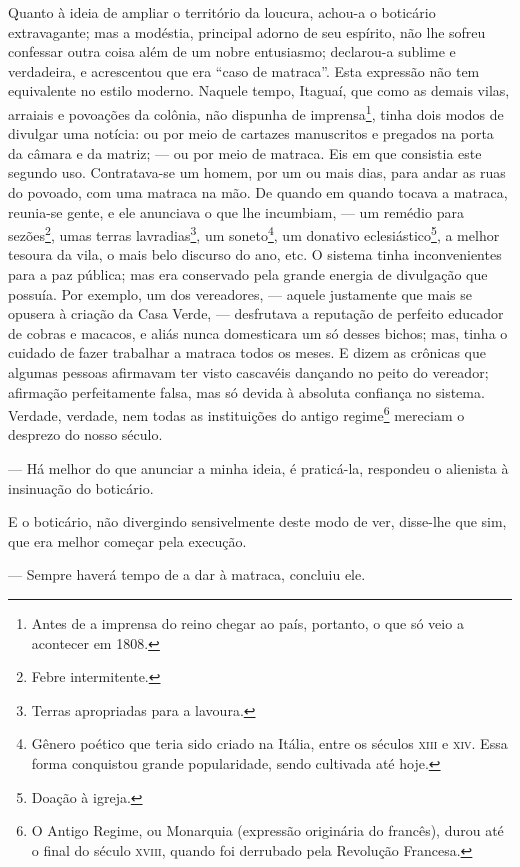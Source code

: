 Quanto à ideia de ampliar o território da loucura, achou-a o boticário
extravagante; mas a modéstia, principal adorno de seu espírito, não lhe
sofreu confessar outra coisa além de um nobre entusiasmo; declarou-a
sublime e verdadeira, e acrescentou que era ``caso de matraca''. Esta
expressão não tem equivalente no estilo moderno. Naquele tempo, Itaguaí,
que como as demais vilas, arraiais e povoações da colônia, não dispunha
de imprensa\footnote{Antes de a imprensa do reino chegar ao país,
  portanto, o que só veio a acontecer em 1808.}, tinha dois modos de
divulgar uma notícia: ou por meio de cartazes manuscritos e pregados na
porta da câmara e da matriz; --- ou por meio de matraca. Eis em que
consistia este segundo uso. Contratava-se um homem, por um ou mais dias,
para andar as ruas do povoado, com uma matraca na mão. De quando em
quando tocava a matraca, reunia-se gente, e ele anunciava o que lhe
incumbiam, --- um remédio para sezões\footnote{Febre intermitente.},
umas terras lavradias\footnote{Terras apropriadas para a lavoura.}, um
soneto\footnote{Gênero poético que teria sido criado na Itália, entre os
  séculos \textsc{xiii} e \textsc{xiv}. Essa forma conquistou grande popularidade, sendo
  cultivada até hoje.}, um donativo eclesiástico\footnote{Doação à
  igreja.}, a melhor tesoura da vila, o mais belo discurso do ano, etc.
O sistema tinha inconvenientes para a paz pública; mas era conservado
pela grande energia de divulgação que possuía. Por exemplo, um dos
vereadores, --- aquele justamente que mais se opusera à criação da Casa
Verde, --- desfrutava a reputação de perfeito educador de cobras e
macacos, e aliás nunca domesticara um só desses bichos; mas, tinha o
cuidado de fazer trabalhar a matraca todos os meses. E dizem as crônicas
que algumas pessoas afirmavam ter visto cascavéis dançando no peito do
vereador; afirmação perfeitamente falsa, mas só devida à absoluta
confiança no sistema. Verdade, verdade, nem todas as instituições do
antigo regime\footnote{O Antigo Regime, ou Monarquia (expressão
  originária do francês), durou até o final do século \textsc{xviii}, quando foi
  derrubado pela Revolução Francesa.} mereciam o desprezo do nosso
século.

--- Há melhor do que anunciar a minha ideia, é praticá-la, respondeu o
alienista à insinuação do boticário.

E o boticário, não divergindo sensivelmente deste modo de ver, disse-lhe
que sim, que era melhor começar pela execução.

--- Sempre haverá tempo de a dar à matraca, concluiu ele.

